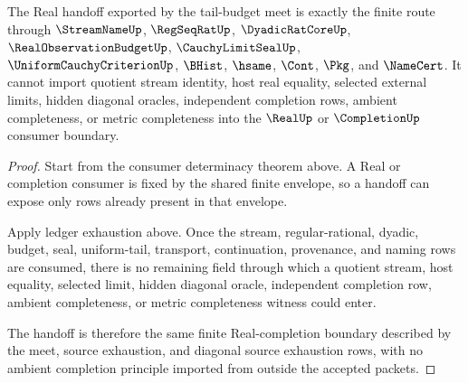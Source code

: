 \begin{theorem}
\label{thm:cauchy-limit-seal-tail-budget-meet-real-handoff}
The Real handoff exported by the tail-budget meet is exactly the finite route through $\StreamNameUp$, $\RegSeqRatUp$, $\DyadicRatCoreUp$, $\RealObservationBudgetUp$, $\CauchyLimitSealUp$, $\UniformCauchyCriterionUp$, $\BHist$, $\hsame$, $\Cont$, $\Pkg$, and $\NameCert$. It cannot import quotient stream identity, host real equality, selected external limits, hidden diagonal oracles, independent completion rows, ambient completeness, or metric completeness into the $\RealUp$ or $\CompletionUp$ consumer boundary.
\end{theorem}
\begin{proof}
Start from the consumer determinacy theorem above. A Real or completion consumer is fixed by the shared finite envelope, so a handoff can expose only rows already present in that envelope.

Apply ledger exhaustion above. Once the stream, regular-rational, dyadic, budget, seal, uniform-tail, transport, continuation, provenance, and naming rows are consumed, there is no remaining field through which a quotient stream, host equality, selected limit, hidden diagonal oracle, independent completion row, ambient completeness, or metric completeness witness could enter.

The handoff is therefore the same finite Real-completion boundary described by the meet, source exhaustion, and diagonal source exhaustion rows, with no ambient completion principle imported from outside the accepted packets.
\end{proof}

